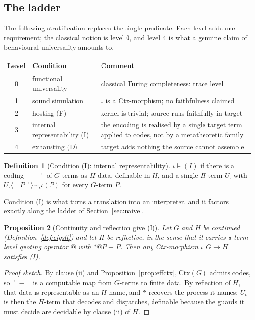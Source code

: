 \documentclass[11pt,a4paper]{article}
\theoremstyle{definition}
\newtheorem{definition}{Definition}[section]
\theoremstyle{plain}
\newtheorem{proposition}[definition]{Proposition}
\theoremstyle{remark}
\newcommand{\Ctx}{\mathrm{Ctx}}
\newcommand{\code}[1]{\ulcorner #1 \urcorner}
\begin{document}
\subsection{The ladder}

The following stratification replaces the single predicate. Each level adds one
requirement; the classical notion is level 0, and level 4 is what a genuine claim of
behavioural universality amounts to.

\begin{center}
\begin{tabular}{@{}clp{6.4cm}@{}}
\toprule
Level & Condition & Comment \\
\midrule
0 & functional universality & classical Turing completeness; trace level \\
1 & sound simulation & $\iota$ is a Ctx-morphism; no faithfulness claimed \\
2 & hosting (F) & kernel is trivial; source runs faithfully in target \\
3 & internal representability (I) & the encoding is realised by a single target
term applied to codes, not by a metatheoretic family \\
4 & exhausting (D) & target adds nothing the source cannot assemble \\
\bottomrule
\end{tabular}
\end{center}

\begin{definition}[Condition (I): internal representability]
\label{def:I}
$\iota \models (I)$ if there is a coding $\code{-}$ of $G$-terms as $H$-data,
definable in $H$, and a single $H$-term $U_\iota$ with
$U_\iota\langle \code{P}\rangle \sim_\iota \iota(P)$ for every $G$-term $P$.
\end{definition}

Condition (I) is what turns a translation into an interpreter, and it factors
exactly along the ladder of Section~\ref{sec:naive}.

\begin{proposition}[Continuity and reflection give (I)]
\label{prop:contrefl}
Let $G$ and $H$ be continued (Definition~\ref{def:cigslt}) and let $H$ be
reflective, in the sense that it carries a term-level quoting operator $@$ with
$*@P \equiv P$. Then any Ctx-morphism $\iota : G \to H$ satisfies (I).
\end{proposition}

\begin{proof}[Proof sketch]
By clause (ii) and Proposition~\ref{prop:effctx}, $\Ctx(G)$ admits codes, so $\code{-}$ is
a computable map from $G$-terms to finite data. By reflection of $H$, that data is
representable as an $H$-name, and $*$ recovers the process it names; $U_\iota$ is
then the $H$-term that decodes and dispatches, definable because the guards it must
decide are decidable by clause (ii) of $H$.
\end{proof}
\end{document}
